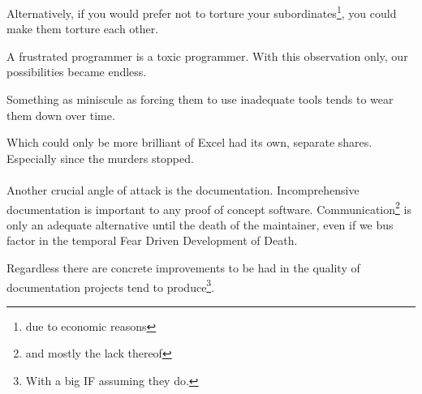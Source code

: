 \documentclass{book}
\begin{document}
    Alternatively,
    if you would prefer not to torture your subordinates\footnote{due to economic reasons},
    you could make them torture each other.

    A frustrated programmer is a toxic programmer.
    With this observation only,
    our possibilities became endless.

    Something as miniscule as forcing them to use inadequate tools
    tends to wear them down over time.

    Which could only be more brilliant of Excel had its own, separate shares.
    Especially since the murders stopped.
    \\

    \\

    Another crucial angle of attack is the documentation.
    Incomprehensive documentation is important %
    to any proof of concept software.          %
    Communication\footnote{and mostly the lack thereof}
    is only an adequate alternative
    until the death of the maintainer,
    even if we bus factor in the temporal Fear Driven Development of Death.
    
    Regardless there are concrete improvements to be had
    in the quality of documentation projects tend to produce\footnote{
        With a big IF assuming they do.
    }.
\end{document}
